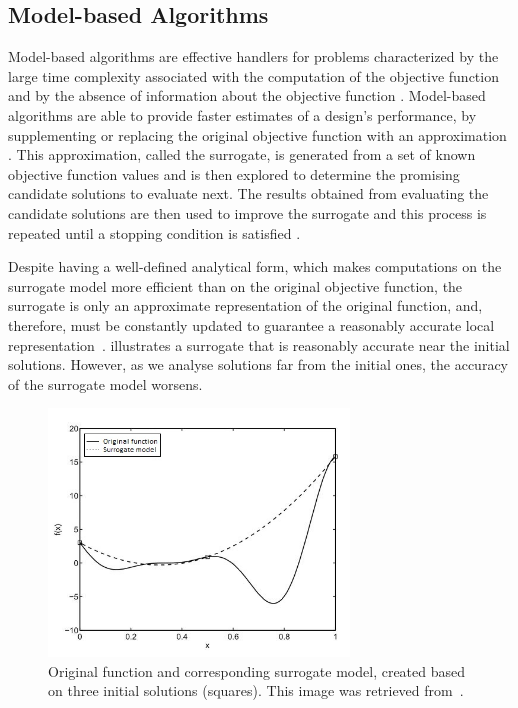 	\subsection{Model-based Algorithms}
	\label{ssec:model-based}
	Model-based algorithms are effective handlers for problems characterized by the large time complexity associated with the computation of the objective function and by the absence of information about the objective function \cite{Forrester2009SBO}. Model-based algorithms are able to provide faster estimates of a design’s performance, by supplementing or replacing the original objective function with an approximation \cite{Wortmann2016BBO}. This approximation, called the surrogate, is generated from a set of known objective function values and is then explored to determine the promising candidate solutions to evaluate next. The results obtained from evaluating the candidate solutions are then used to improve the surrogate and this process is repeated until a stopping condition is satisfied \cite{Koziel2011}.
	
	Despite having a well-defined analytical form, which makes computations on the surrogate model more efficient than on the original objective function, the surrogate is only an approximate representation of the original function, and, therefore, must be constantly updated to guarantee a reasonably accurate local representation~\cite{Koziel2011}.  illustrates a surrogate that is reasonably accurate near the initial solutions. However, as we analyse solutions far from the initial ones, the accuracy of the surrogate model worsens.
	\begin{figure}[h!]
		\centering
		\includegraphics[width=8cm]{Images/Background/sbosexample.JPG}
		\caption[Example of a surrogate model]{Original function and corresponding surrogate model, created based on three initial solutions (squares). This image was retrieved from~\cite{Koziel2011}.}
		\label{fig:sbosexample}
	\end{figure}
	
